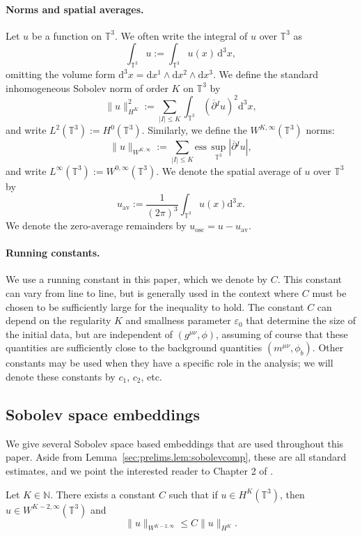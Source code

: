 \documentclass{article}
\newcommand{\NN}{\mathbb{N}}
\newcommand{\TT}{\mathbb{T}}
\newcommand{\osc}{\mathrm{osc}}
\newcommand{\av}{\mathrm{av}}
\newcommand{\de}{\mathrm{d}}
\newcommand{\ol}{\overline}
\newcommand{\ve}{\varepsilon}
\newcommand{\pa}{\partial}
\begin{document}
\paragraph{Norms and spatial averages.}
Let $u$ be a function on $\TT^3$. We often write the integral of $u$ over $\TT^3$ as
\begin{equation}
    \int_{\TT^3} u := \int_{\TT^3}u(x)\,\de^3 x,
\end{equation}
omitting the volume form $\de^3 x = \de x^1 \wedge \de x^2 \wedge \de x^3$.
We define the standard inhomogeneous Sobolev norm of order $K$ on $\TT^3$ by
\begin{equation}
    \|u\|_{H^K}^2 := \sum_{|I|\leq K}\int_{\TT^3}(\ol{\pa}{}^I u)^2\de^3 x,
\end{equation}
and write $L^2(\TT^3) := H^0(\TT^3)$. Similarly, we define the $W^{K,\infty}(\TT^3)$ norms:
\begin{equation}
    \|u\|_{W^{K,\infty}} := \sum_{|I|\leq K} \mathrm{ess}\,\sup_{\TT^3}|\ol{\pa}{}^Iu|,
\end{equation}
and write $L^\infty(\TT^3):= W^{0,\infty}(\TT^3)$. We denote the spatial average of $u$ over $\TT^3$ by
\begin{equation}
    u_{\av} := \frac{1}{(2\pi)^3}\int_{\TT^3}u(x)\de^3 x.
\end{equation}
We denote the zero-average remainders by $u_{\osc} = u-u_{\av}$.
\paragraph*{Running constants.}
We use a running constant in this paper, which we denote by $C$. This constant can vary from line to line, but is generally used in the context where $C$ must be chosen to be sufficiently large for the inequality to hold. The constant $C$ can depend on the regularity $K$ and smallness parameter $\ve_0$ that determine the size of the initial data, but are independent of $(g^{\mu\nu},\phi)$, assuming of course that these quantities are sufficiently close to the background quantities $(m^{\mu\nu},\phi_b)$. Other constants may be used when they have a specific role in the analysis; we will denote these constants by $c_1$, $c_2$, etc.
\subsection{Sobolev space embeddings}\label{sec:prelims.subsec:sobolev}
We give several Sobolev space based embeddings that are used throughout this paper. Aside from Lemma~\ref{sec:prelims.lem:sobolevcomp}, these are all standard estimates, and we point the interested reader to Chapter 2 of \cite{Heb:sob:00}.
\begin{lemma}\label{sec:prelims.lem:sobolev}
Let $K \in \NN$. There exists a constant $C$ such that if $u \in H^K(\TT^3)$, then $u \in W^{K-2,\infty}(\TT^3)$ and
   \begin{equation}\label{sec:prelims.eq:sobolev}
       \|u\|_{W^{K-2,\infty}} \leq  C\|u\|_{H^K}.
   \end{equation} 
\end{lemma}
\end{document}
